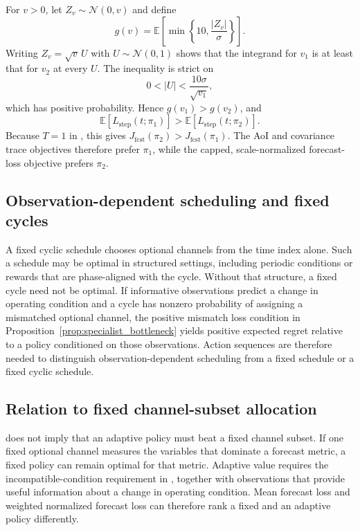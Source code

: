 For $v>0$, let $Z_v\sim\mathcal{N}(0,v)$ and define
\begin{equation}
  g(v)=\mathbb{E}\!\left[
  \min\!\left\{10,\frac{|Z_v|}{\sigma}\right\}
  \right].
\end{equation}
Writing $Z_v=\sqrt{v}\,U$ with $U\sim\mathcal{N}(0,1)$ shows that the integrand
for $v_1$ is at least that for $v_2$ at every $U$. The inequality is strict on
\begin{equation}
  0<|U|<\frac{10\sigma}{\sqrt{v_1}},
\end{equation}
which has positive probability. Hence $g(v_1)>g(v_2)$, and
\begin{equation}
  \mathbb{E}[L_{\mathrm{step}}(t;\pi_1)]
  >
  \mathbb{E}[L_{\mathrm{step}}(t;\pi_2)].
\end{equation}
Because $T=1$ in , this gives
$J_{\mathrm{fcst}}(\pi_2)>J_{\mathrm{fcst}}(\pi_1)$. The AoI and covariance
trace objectives therefore prefer $\pi_1$, while the capped, scale-normalized
forecast-loss objective prefers $\pi_2$.

\subsection{Observation-dependent scheduling and fixed cycles}

A fixed cyclic schedule chooses optional channels from the time index alone. Such a schedule may be
optimal in structured settings, including periodic conditions or rewards that are
phase-aligned with the cycle. Without that structure, a fixed cycle need not be
optimal. If informative observations predict a change in operating condition and a cycle has
nonzero probability of assigning a mismatched optional channel, the positive mismatch
loss condition in Proposition~\ref{prop:specialist_bottleneck} yields positive
expected regret relative to a policy conditioned on those observations. Action
sequences are therefore needed to distinguish observation-dependent scheduling
from a fixed schedule or a fixed cyclic schedule.

\subsection{Relation to fixed channel-subset allocation}

 does not imply that an adaptive policy must beat a
fixed channel subset. If one fixed optional channel measures the variables that dominate a
forecast metric, a fixed policy can remain optimal for that metric. Adaptive
value requires the incompatible-condition requirement in
, together with observations that provide useful
information about a change in operating condition. Mean forecast loss and
weighted normalized forecast loss can therefore rank a fixed and an adaptive
policy differently.

